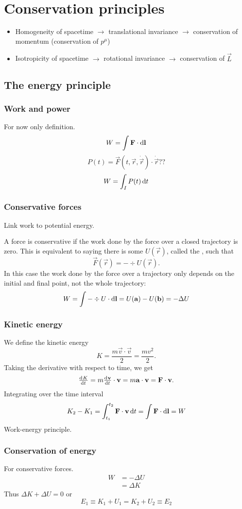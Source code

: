 \chapter{Conservation principles}
\begin{itemize}
\item Homogeneity of spacetime $\rightarrow$ translational invariance $\rightarrow$ conservation of momentum (conservation of $p^\mu$)
\item Isotropicity of spacetime $\rightarrow$ rotational invariance $\rightarrow$ conservation of $\vec{L}$
\end{itemize}
\section{The energy principle}
\subsection{Work and power}
For now only definition.
\[ W = \int \bm{\mathrm{F}}\cdot \operatorname{d \!}{\bm{\mathrm{l}}} \]
\[ P(t) = \vec{F}(t, \vec{r}, \dot{\vec{r}})\cdot \dot{\vec{r}} ?? \]
\[ W = \int_I P(t) \operatorname{d \!}{t} \]
\subsection{Conservative forces}
Link work to potential energy.

A force is conservative if the work done by the force over a closed trajectory is zero. This is equivalent to saying there is some $U(\vec{r})$, called the , such that
\[ \vec{F}(\vec{r}) = -\div U(\vec{r}). \]
In this case the work done by the force over a trajectory only depends on the initial and final point, not the whole trajectory:
\[ W = \int -\div U \cdot \operatorname{d \!}{\bm{\mathrm{l}}} = U(\bm{\mathrm{a}}) - U(\bm{\mathrm{b}}) = -\Delta U \]


\subsection{Kinetic energy}
We define the kinetic energy
\[ K = \frac{m \vec{v}\cdot \vec{v}}{2} = \frac{mv^2}{2}. \]
Taking the derivative with respect to time, we get
\[ \od{K}{t} = m \od{\vec{v}}{t} \cdot \vec{v} = m\vec{a}\cdot \vec{v} = \vec{F}\cdot \vec{v}. \]
Integrating over the time interval
\[ K_2-K_1 = \int_{t_1}^{t_2} \bm{\mathrm{F}}\cdot \bm{\mathrm{v}} \operatorname{d \!}{t} = \int \bm{\mathrm{F}}\cdot \operatorname{d \!}{\bm{\mathrm{l}}} = W\]
Work-energy principle.

\subsection{Conservation of energy}
For conservative forces.
\begin{align*}
W &= -\Delta U \\
&= \Delta K
\end{align*}
Thus $\Delta K + \Delta U = 0$ or
\[ E_1 \equiv K_1 + U_1 = K_2 + U_2 \equiv E_2 \]

